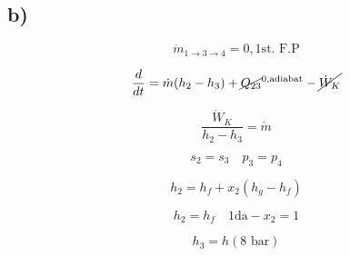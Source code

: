 

\subsection*{b)}

\[
\dot{m}_{1 \rightarrow 3 \rightarrow 4} = 0, \text{1st. F.P}
\]

\[
\frac{d}{dt} = \dot{m} (h_2 - h_3) + \cancel{Q_{23}}^{0, \text{adiabat}} - \cancel{\dot{W}_K}
\]

\[
\frac{\dot{W}_K}{h_2 - h_3} = \dot{m}
\]

\[
s_2 = s_3 \quad p_3 = p_4
\]

\[
h_2 = h_f + x_2 (h_g - h_f)
\]

\[
h_2 = h_f \quad 1 \text{da} - x_2 = 1
\]

\[
h_3 = h(8 \text{ bar})
\]